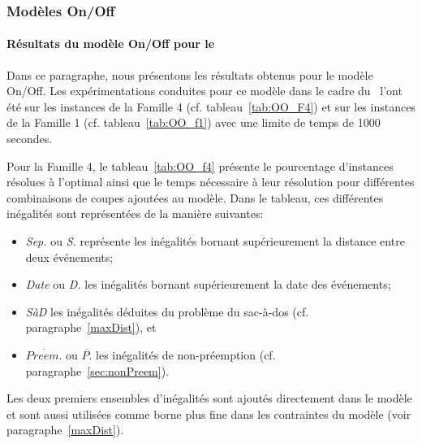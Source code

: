 \subsubsection{Modèles On/Off}

\paragraph{Résultats du modèle On/Off pour le \CECSP}
Dans ce paragraphe, nous présentons les résultats obtenus pour le
modèle On/Off. Les expérimentations conduites pour ce modèle dans le
cadre du \CECSP~l'ont été
sur les instances de la Famille 4 (cf. tableau~\ref{tab:OO_F4}) et sur les
instances de la Famille 1 (cf. tableau~\ref{tab:OO_f1}) avec une
limite de temps de 1000 secondes.  

Pour la Famille 4, le tableau~\ref{tab:OO_f4} présente le pourcentage
d'instances résolues à l'optimal ainsi que le temps nécessaire à leur 
résolution pour différentes combinaisons de coupes ajoutées au
modèle. Dans le tableau, ces différentes inégalités sont représentées
de la manière suivantes: 
\begin{itemize}
\item {\it Sep.} ou {\it S.} représente les inégalités
 bornant supérieurement la distance entre deux événements;
\item {\it Date} ou {\it D.} les inégalités bornant supérieurement la
  date des événements;
\item {\it SàD} les inégalités déduites du problème du sac-à-dos (cf. paragraphe~\ref{maxDist}), et 
\item {\it $\overline{Preem.}$} ou {\it $\overline{P.}$} les
  inégalités de non-préemption (cf. paragraphe~\ref{sec:nonPreem}).
\end{itemize}
 Les deux premiers ensembles d'inégalités sont ajoutés directement
 dans le modèle et sont aussi utilisées comme borne plus fine dans les
 contraintes du modèle (voir paragraphe~\ref{maxDist}).


